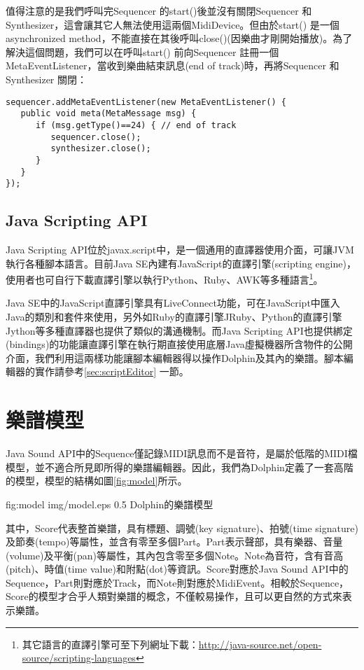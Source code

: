 \documentclass[12pt,a4paper,oneside]{report}
\begin{document}
值得注意的是我們呼叫完Sequencer 的start()後並沒有關閉Sequencer 和Synthesizer，這會讓其它人無法使用這兩個MidiDevice。但由於start() 是一個asynchronized method，不能直接在其後呼叫close()(因樂曲才剛開始播放)。為了解決這個問題，我們可以在呼叫start() 前向Sequencer 註冊一個MetaEventListener，當收到樂曲結束訊息(end of track)時，再將Sequencer 和Synthesizer 關閉：

\begin{verbatim}
sequencer.addMetaEventListener(new MetaEventListener() {
   public void meta(MetaMessage msg) {
      if (msg.getType()==24) { // end of track
         sequencer.close();
         synthesizer.close();
      }
   }
});
\end{verbatim}

\subsection{Java Scripting API} %

Java Scripting API位於javax.script中，是一個通用的直譯器使用介面，可讓JVM 執行各種腳本語言。目前Java SE內建有JavaScript的直譯引擎(scripting engine)，使用者也可自行下載直譯引擎以執行Python、Ruby、AWK等多種語言\footnote{其它語言的直譯引擎可至下列網址下載：\url{http://java-source.net/open-source/scripting-languages}}。

Java SE中的JavaScript直譯引擎具有LiveConnect功能，可在JavaScript中匯入Java的類別和套件來使用，另外如Ruby的直譯引擎JRuby、Python的直譯引擎Jython等多種直譯器也提供了類似的溝通機制。而Java Scripting API也提供綁定(bindings)的功能讓直譯引擎在執行期直接使用底層Java虛擬機器所含物件的公開介面，我們利用這兩樣功能讓腳本編輯器得以操作Dolphin及其內的樂譜。腳本編輯器的實作請參考\ref{sec:scriptEditor} 一節。

\section{樂譜模型}

Java Sound API中的Sequence僅記錄MIDI訊息而不是音符，是屬於低階的MIDI檔模型，並不適合所見即所得的樂譜編輯器。因此，我們為Dolphin定義了一套高階的模型，模型的結構如圖\ref{fig:model}所示。

\figurewithcaption
{fig:model}
{img/model.eps}
{0.5}
{Dolphin的樂譜模型}

其中，Score代表整首樂譜，具有標題、調號(key signature)、拍號(time signature)及節奏(tempo)等屬性，並含有零至多個Part。Part表示聲部，具有樂器、音量(volume)及平衡(pan)等屬性，其內包含零至多個Note。Note為音符，含有音高(pitch)、時值(time value)和附點(dot)等資訊。Score對應於Java Sound API中的Sequence，Part則對應於Track，而Note則對應於MidiEvent。相較於Sequence，Score的模型才合乎人類對樂譜的概念，不僅較易操作，且可以更自然的方式來表示樂譜。
\end{document}
